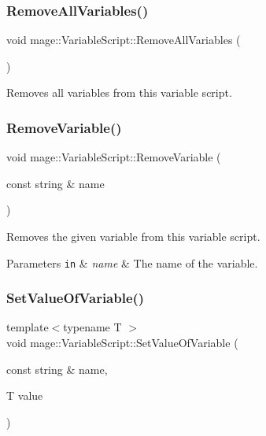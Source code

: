 \subsubsection{\texorpdfstring{Remove\+All\+Variables()}{RemoveAllVariables()}}
{\footnotesize\ttfamily void mage\+::\+Variable\+Script\+::\+Remove\+All\+Variables (\begin{DoxyParamCaption}{ }\end{DoxyParamCaption})\hspace{0.3cm}{\ttfamily [noexcept]}}

Removes all variables from this variable script. \hypertarget{classmage_1_1_variable_script_a4970ef4faafb1a6a43c4648ec9f36cce}{}\label{classmage_1_1_variable_script_a4970ef4faafb1a6a43c4648ec9f36cce} 
\subsubsection{\texorpdfstring{Remove\+Variable()}{RemoveVariable()}}
{\footnotesize\ttfamily void mage\+::\+Variable\+Script\+::\+Remove\+Variable (\begin{DoxyParamCaption}\item[{const string \&}]{name }\end{DoxyParamCaption})}

Removes the given variable from this variable script.


\begin{DoxyParams}[1]{Parameters}
\mbox{\tt in}  & {\em name} & The name of the variable. \\
\hline
\end{DoxyParams}
\hypertarget{classmage_1_1_variable_script_a3a006a5e30f0aae36503d560479511b5}{}\label{classmage_1_1_variable_script_a3a006a5e30f0aae36503d560479511b5} 
\subsubsection{\texorpdfstring{Set\+Value\+Of\+Variable()}{SetValueOfVariable()}}
{\footnotesize\ttfamily template$<$typename T $>$ \\
void mage\+::\+Variable\+Script\+::\+Set\+Value\+Of\+Variable (\begin{DoxyParamCaption}\item[{const string \&}]{name,  }\item[{T}]{value }\end{DoxyParamCaption})}

